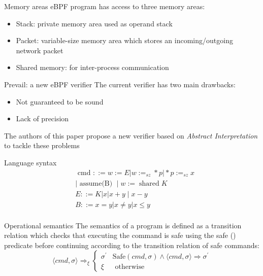 \documentclass[aspectratio=169]{beamer}
\begin{document}
\begin{frame}{Memory areas}
    eBPF program has access to three memory areas:
    \begin{itemize}
        \item Stack: private memory area used as operand stack
        \item Packet: variable-size memory area which stores an incoming/outgoing network packet
        \item Shared memory: for inter-process communication
    \end{itemize}
\end{frame}

\begin{frame}{Prevail: a new eBPF verifier}
  The current verifier has two main drawbacks:
  \begin{itemize}
    \item Not guaranteed to be sound
    \item Lack of precision
  \end{itemize}
  The authors of this paper propose a new verifier based on \textit{Abstract Interpretation} to tackle these
 problems
\end{frame}

\begin{frame}{Language syntax}
$$
\begin{aligned}
& \text { cmd }::=w:=E\left|w:=_{s z} * p\right| * p:=_{s z} x \\
& \mid \text { assume(B) } \mid w:=\operatorname{shared} K \\
& E::=K|x| x+y \mid x-y \\
& B ::=x=y|x \neq y| x \leq y \\
&
\end{aligned}
$$
\end{frame}

\begin{frame}{Operational semantics}
The semantics of a program is defined as a transition relation which checks that executing the command is safe using the safe () predicate before continuing according to the transition relation of safe commands:
$$
\langle c m d, \sigma\rangle \Rightarrow_{\xi} \begin{cases}\sigma^{\prime} & \mathrm{Safe}(c m d, \sigma) \wedge\langle c m d, \sigma\rangle \Rightarrow \sigma^{\prime} \\ \xi & \text { otherwise }\end{cases}
$$
\end{frame}
\end{document}
